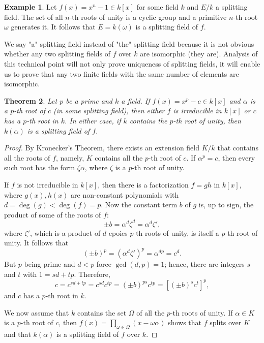 \documentclass[12pt]{report}
\newtheorem{thm}{Theorem}[section]
\theoremstyle{definition}
\newtheorem{example}[thm]{Example}
\def\aa{\alpha}
\begin{document}
\begin{example}
    Let $f(x)=x^n-1 \in k[x]$ for some field $k$ and $E/k$ a splitting field. The set of all $n$-th roots of unity is a cyclic group and a primitive $n$-th root $\omega$ generates it. It follows that $E=k(\omega)$ is a splitting field of $f$. 
\end{example}

We say "a" splitting field instead of "the" splitting field because it is not obvious whether any two splitting fields of $f$ over $k$ are isomorphic (they are). Analysis of this technical point will not only prove uniqueness of splitting fields, it will enable us to prove that any two finite fields with the same number of elements are isomorphic.

\begin{thm}\label{kummer1}
    Let $p$ be a prime and $k$ a field. If $f(x)=x^p-c\in k[x]$ and $\aa$ is a $p$-th root of $c$ (in some splitting field), then either $f$ is irreducible in $k[x]$ or $c$ has a $p$-th root in $k$. In either case, if $k$ contains the $p$-th root of unity, then $k(\aa)$ is a splitting field of $f$.
\end{thm}

\begin{proof}
    By Kronecker's Theorem, there exists an extension field $K/k$ that contains all the roots of $f$, namely, $K$ contains all the $p$-th root of $c$. If $\aa^p=c$, then every such root has the form $\zeta\aa$, where $\zeta$ is a $p$-th root of unity.

    If $f$ is not irreducible in $k[x]$, then there is a factorization $f = gh$ in $k[x]$, where $g(x), h(x)$ are non-constant polynomials with $d = \deg(g) < \deg(f) = p$. Now the constant term $b$ of $g$ is, up to sign, the product of some of the roots of $f$: $$\pm b = \aa^d \zeta^d = \aa^d\zeta',$$ where $\zeta'$, which is a product of $d$ cpoies $p$-th roots of unity, is itself a $p$-th root of unity. It follows that $$(\pm b)^p = (\aa^d\zeta')^p = \aa^{dp} = c^d.$$
    But $p$ being prime and $d < p$ force $\gcd(d, p) = 1$; hence, there are integers $s$ and $t$ with $1 = sd + tp$. Therefore, $$c = c^{sd+tp} = c^{sd}c^{tp} = (\pm b)^{ps}c^{tp} = [(\pm b)^sc^t]^p,$$ and $c$ has a $p$-th root in $k$.

    We now assume that $k$ contains the set $\Omega$ of all the $p$-th roots of unity. If $\aa  \in  K$ is a $p$-th root of $c$, then $f(x) =\prod_{\omega\in \Omega}(x- \omega\aa )$ shows that $f$ splits over $K$ and that $k(\aa)$ is a splitting field of $f$ over $k$. 
\end{proof}
\end{document}
